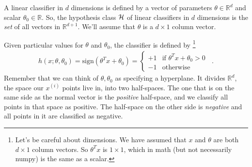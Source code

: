 \documentclass[11pt]{article}
\newcommand{\anchorednote}[2]{ #1 \note{#2} }	%
\newcommand{\note}[1]{\todo[color=blue!10,
  linecolor=blue!90,size=\small]{\linespread{0.9}\selectfont{#1}\par}}
\renewcommand{\note}[1]{\footnote{#1}}
\newcommand\ex[2]{#1^{(#2)}}
\newcommand\hclass{{\cal H}}
\newcommand{\R}{\mathbb{R}}
\begin{document}
A linear classifier in $d$ dimensions is 
defined by a vector of parameters $\theta \in \R^d$ and scalar
$\theta_0 \in \R$.  So, the hypothesis class $\hclass$ of linear
classifiers in $d$ dimensions is the {\em set} of all vectors in
$\R^{d+1}$.   We'll assume that $\theta$ is a $d \times 1$ column
vector. 

Given particular values for $\theta$ and $\theta_0$, the  \anchorednote{classifier is
defined by}{Let's be careful about dimensions.  We have assumed that $x$ and
  $\theta$ are both $d \times 1$ column vectors.  So $\theta^T x$ is $1
\times 1$, which in math (but not necessarily numpy) is the same as a
scalar.} 
\begin{eqnarray*}
  h(x; \theta, \theta_0) = \text{sign}(\theta^T x + \theta_0)
= \begin{cases} +1 & \text{if $\theta^Tx + \theta_0 > 0$} \\ -1 &
  \text{otherwise}\end{cases} \;\;.
\end{eqnarray*}
Remember that we can think of $\theta, \theta_0$ as specifying a
hyperplane.  It divides $\R^d$, the space our $\ex{x}{i}$ points live
in, into two half-spaces.  The one that is on the same side as the
normal vector is the {\em positive} half-space, and we classify all
points in that space as positive.  The half-space on the other side is
{\em negative} and all points in it are classified as negative.
\end{document}
